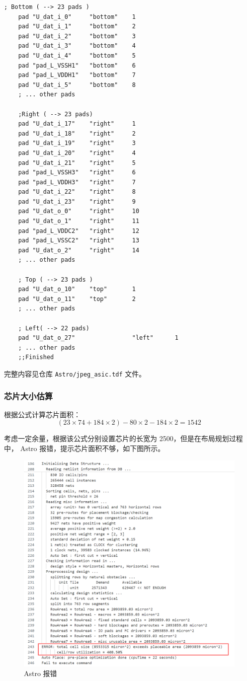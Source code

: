 \documentclass[12pt,hyperref,a4paper,UTF8]{ctexart}
\begin{document}
\newpage
\begin{lstlisting}[style=tdfstyle,name=jpeg_asic.tdf]
    ; Bottom ( --> 23 pads )	 
    pad "U_dat_i_0" 	"bottom" 	1
    pad "U_dat_i_1" 	"bottom" 	2
    pad "U_dat_i_2" 	"bottom" 	3
    pad "U_dat_i_3" 	"bottom" 	4
    pad "U_dat_i_4" 	"bottom" 	5
    pad "pad_L_VSSH1"	"bottom" 	6
    pad "pad_L_VDDH1" 	"bottom" 	7
    pad "U_dat_i_5" 	"bottom" 	8
    ; ... other pads

    ;Right ( --> 23 pads)
    pad "U_dat_i_17" 	"right"	    1
    pad "U_dat_i_18" 	"right"		2
    pad "U_dat_i_19" 	"right"		3
    pad "U_dat_i_20" 	"right"		4
    pad "U_dat_i_21" 	"right"		5
    pad "pad_L_VSSH3"	"right" 	6
    pad "pad_L_VDDH3" 	"right" 	7
    pad "U_dat_i_22" 	"right"		8
    pad "U_dat_i_23" 	"right" 	9
    pad "U_dat_o_0" 	"right"		10
    pad "U_dat_o_1" 	"right"	    11
    pad "pad_L_VDDC2"	"right"		12
    pad "pad_L_VSSC2"	"right" 	13
    pad "U_dat_o_2" 	"right"		14	
    ; ... other pads

    ; Top ( --> 23 pads )
    pad "U_dat_o_10" 	"top"		1
    pad "U_dat_o_11" 	"top"		2
    ; ... other pads

    ; Left( --> 22 pads)
    pad "U_dat_o_27" 	            "left"		1
    ; ... other pads
    ;;Finished
\end{lstlisting}
完整内容见仓库 \texttt{Astro/jpeg\_asic.tdf} 文件。

\subsubsection{芯片大小估算}
根据公式计算芯片面积：
\begin{equation}
    (23 \times 74 + 184 \times 2)- 80 \times 2 - 184\times 2 = 1542
\end{equation}

考虑一定余量，根据该公式分别设置芯片的长宽为 2500，但是在布局规划过程中，
Astro 报错，提示芯片面积不够，如下图所示。
\begin{figure}[htbp]
    \centering
    \includegraphics[width =.8\textwidth]{figures/astro_floorplan_err.png}
    \caption{Astro 报错}
    \label{astro_error}
\end{figure}
\end{document}
